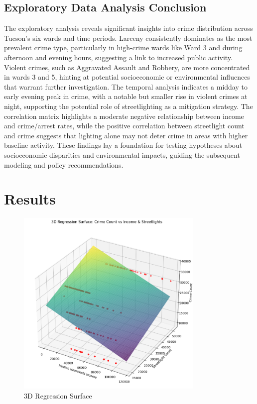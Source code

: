 \documentclass{report}
\begin{document}
\section{Exploratory Data Analysis Conclusion}
\par The exploratory analysis reveals significant insights into crime distribution across Tucson’s six wards and time periods. Larceny consistently dominates as the most prevalent crime type, particularly in high-crime wards like Ward 3 and during afternoon and evening hours, suggesting a link to increased public activity. Violent crimes, such as Aggravated Assault and Robbery, are more concentrated in wards 3 and 5, hinting at potential socioeconomic or environmental influences that warrant further investigation. The temporal analysis indicates a midday to early evening peak in crime, with a notable but smaller rise in violent crimes at night, supporting the potential role of streetlighting as a mitigation strategy. The correlation matrix highlights a moderate negative relationship between income and crime/arrest rates, while the positive correlation between streetlight count and crime suggests that lighting alone may not deter crime in areas with higher baseline activity. These findings lay a foundation for testing hypotheses about socioeconomic disparities and environmental impacts, guiding the subsequent modeling and policy recommendations.

\chapter{Results}

\begin{figure}[htbp]
  \centering
  \includegraphics[width=0.8\textwidth]{3d-cover.png}
  \caption{3D Regression Surface}
  \label{fig:3d-cover}
\end{figure}
\end{document}

